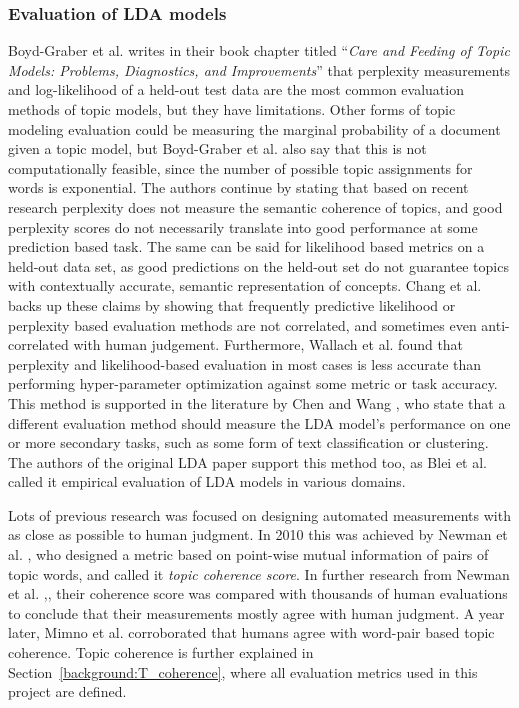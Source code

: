         \subsubsection{Evaluation of LDA models}
            Boyd-Graber et al. \cite{boyd2014care} writes in their book chapter titled ``\textit{Care and Feeding of Topic Models: Problems, Diagnostics, and Improvements}'' that perplexity measurements and log-likelihood of a held-out test data are the most common evaluation methods of topic models, but they have limitations. Other forms of topic modeling evaluation could be measuring the marginal probability of a document given a topic model, but Boyd-Graber et al. \cite{boyd2014care} also say that this is not computationally feasible, since the number of possible topic assignments for words is exponential. The authors continue by stating that based on recent research perplexity does not measure the semantic coherence of topics, and good perplexity scores do not necessarily translate into good performance at some prediction based task. The same can be said for likelihood based metrics on a held-out data set, as good predictions on the held-out set do not guarantee topics with contextually accurate, semantic representation of concepts. Chang et al. \cite{chang2009reading} backs up these claims by showing that frequently predictive likelihood or perplexity based evaluation methods are not correlated, and sometimes even anti-correlated with human judgement. Furthermore, Wallach et al. \cite{wallach2009rethinking} found that perplexity and likelihood-based evaluation in most cases is less accurate than performing hyper-parameter optimization against some metric or task accuracy. This method is supported in the literature by Chen and Wang \cite{chen2011latent}, who state that a different evaluation method should measure the LDA model's performance on one or more secondary tasks, such as some form of text classification or clustering. The authors of the original LDA paper support this method too, as Blei et al. \cite{blei2003latent} called it empirical evaluation of LDA models in various domains. 
            
            Lots of previous research was focused on designing automated measurements with as close as possible to human judgment. In 2010 this was achieved by Newman et al. \cite{newman2010visualizing}, who designed a metric based on point-wise mutual information of pairs of topic words, and called it \emph{topic coherence score}. In further research from Newman et al. \cite{newman2010visualizing},\cite{newman2010automatic}, their coherence score was compared with thousands of human evaluations to conclude that their measurements mostly agree with human judgment. A year later, Mimno et al. \cite{mimno2011optimizing} corroborated that humans agree with word-pair based topic coherence. Topic coherence is further explained in Section~\ref{background:T_coherence}, where all evaluation metrics used in this project are defined. 
        
